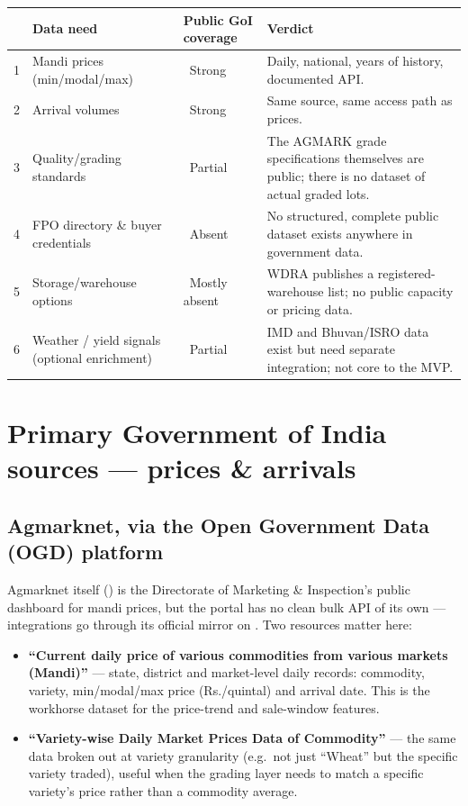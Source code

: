 \documentclass[11pt]{article}
\newcommand{\yes}{{\color{gxgreen}\ding{108}}}
\newcommand{\pmid}{{\color{gxcyan}\ding{109}}}
\newcommand{\bld}{{\color{gxamber}\ding{53}}}
\begin{document}
\renewcommand{\arraystretch}{1.3}
\noindent\begin{longtable}{@{}p{0.5cm}p{4.6cm}p{2.6cm}p{7.3cm}@{}}
\toprule
& \textbf{Data need} & \textbf{Public GoI coverage} & \textbf{Verdict} \\
\midrule
\endhead
1 & Mandi prices (min/modal/max) & \yes\ Strong & Daily, national, years of history, documented API. \\
2 & Arrival volumes & \yes\ Strong & Same source, same access path as prices. \\
3 & Quality/grading standards & \pmid\ Partial & The AGMARK grade specifications themselves are public; there is no dataset of actual graded lots. \\
4 & FPO directory \& buyer credentials & \bld\ Absent & No structured, complete public dataset exists anywhere in government data. \\
5 & Storage/warehouse options & \bld\ Mostly absent & WDRA publishes a registered-warehouse list; no public capacity or pricing data. \\
6 & Weather / yield signals (optional enrichment) & \pmid\ Partial & IMD and Bhuvan/ISRO data exist but need separate integration; not core to the MVP. \\
\bottomrule
\end{longtable}

\clearpage
\section{Primary Government of India sources --- prices \& arrivals}

\subsection*{Agmarknet, via the Open Government Data (OGD) platform}
Agmarknet itself () is the Directorate of Marketing \& Inspection's public
dashboard for mandi prices, but the portal has no clean bulk API of its own --- integrations go through its
official mirror on . Two resources matter here:

\begin{itemize}[leftmargin=1.4em]
\item \textbf{``Current daily price of various commodities from various markets (Mandi)''} --- state,
district and market-level daily records: commodity, variety, min/modal/max price (Rs./quintal) and arrival
date. This is the workhorse dataset for the price-trend and sale-window features.
\item \textbf{``Variety-wise Daily Market Prices Data of Commodity''} --- the same data broken out at
variety granularity (e.g.\ not just ``Wheat'' but the specific variety traded), useful when the grading
layer needs to match a specific variety's price rather than a commodity average.
\end{itemize}
\end{document}

